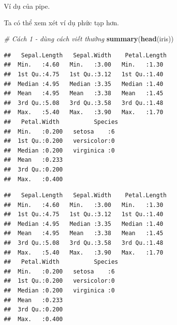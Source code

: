 \documentclass[]{krantz}
\makeatletter
\newenvironment{Shaded}{\begin{snugshade}}{\end{snugshade}}
\newcommand{\CommentTok}[1]{\textcolor[rgb]{0.37,0.37,0.37}{\textit{#1}}}
\newcommand{\KeywordTok}[1]{\textcolor[rgb]{0.27,0.27,0.27}{\textbf{#1}}}
\newcommand{\NormalTok}[1]{#1}
\newcommand{\OperatorTok}[1]{\textcolor[rgb]{0.43,0.43,0.43}{\textbf{#1}}}
\newcommand{\StringTok}[1]{\textcolor[rgb]{0.5,0.5,0.5}{#1}}
\newenvironment{kframe}{%
\medskip{}
\setlength{\fboxsep}{.8em}
 \def\at@end@of@kframe{}%
 \ifinner\ifhmode%
  \def\at@end@of@kframe{\end{minipage}}%
  \begin{minipage}{\columnwidth}%
 \fi\fi%
 \def\FrameCommand##1{\hskip\@totalleftmargin \hskip-\fboxsep
 \colorbox{shadecolor}{##1}\hskip-\fboxsep
     \hskip-\linewidth \hskip-\@totalleftmargin \hskip\columnwidth}%
 \MakeFramed {\advance\hsize-\width
   \@totalleftmargin\z@ \linewidth\hsize
   \@setminipage}}%
 {\par\unskip\endMakeFramed%
 \at@end@of@kframe}
\renewenvironment{Shaded}{\begin{kframe}}{\end{kframe}}
\renewenvironment{Shaded}{\begin{snugshade}}{\end{snugshade}}
\renewcommand{\CommentTok}[1]{\textcolor[rgb]{0.56,0.35,0.01}{\textit{#1}}}
\renewcommand{\KeywordTok}[1]{\textcolor[rgb]{0.13,0.29,0.53}{\textbf{#1}}}
\renewcommand{\NormalTok}[1]{#1}
\renewcommand{\OperatorTok}[1]{\textcolor[rgb]{0.81,0.36,0.00}{\textbf{#1}}}
\renewcommand{\StringTok}[1]{\textcolor[rgb]{0.31,0.60,0.02}{#1}}
\theoremstyle{definition}
\theoremstyle{definition}
\theoremstyle{definition}
\theoremstyle{remark}
\makeatother
\begin{document}
Ví dụ của pipe.

\begin{Shaded}
\end{Shaded}

Ta có thể xem xét ví dụ phức tạp hơn.

\begin{Shaded}
\begin{Highlighting}[]
\CommentTok{# Cách 1 - dùng cách viết thường}
\KeywordTok{summary}\NormalTok{(}\KeywordTok{head}\NormalTok{(iris))}
\end{Highlighting}
\end{Shaded}

\begin{verbatim}
##   Sepal.Length   Sepal.Width    Petal.Length 
##  Min.   :4.60   Min.   :3.00   Min.   :1.30  
##  1st Qu.:4.75   1st Qu.:3.12   1st Qu.:1.40  
##  Median :4.95   Median :3.35   Median :1.40  
##  Mean   :4.95   Mean   :3.38   Mean   :1.45  
##  3rd Qu.:5.08   3rd Qu.:3.58   3rd Qu.:1.48  
##  Max.   :5.40   Max.   :3.90   Max.   :1.70  
##   Petal.Width          Species 
##  Min.   :0.200   setosa    :6  
##  1st Qu.:0.200   versicolor:0  
##  Median :0.200   virginica :0  
##  Mean   :0.233                 
##  3rd Qu.:0.200                 
##  Max.   :0.400
\end{verbatim}

\begin{Shaded}
\end{Shaded}

\begin{verbatim}
##   Sepal.Length   Sepal.Width    Petal.Length 
##  Min.   :4.60   Min.   :3.00   Min.   :1.30  
##  1st Qu.:4.75   1st Qu.:3.12   1st Qu.:1.40  
##  Median :4.95   Median :3.35   Median :1.40  
##  Mean   :4.95   Mean   :3.38   Mean   :1.45  
##  3rd Qu.:5.08   3rd Qu.:3.58   3rd Qu.:1.48  
##  Max.   :5.40   Max.   :3.90   Max.   :1.70  
##   Petal.Width          Species 
##  Min.   :0.200   setosa    :6  
##  1st Qu.:0.200   versicolor:0  
##  Median :0.200   virginica :0  
##  Mean   :0.233                 
##  3rd Qu.:0.200                 
##  Max.   :0.400
\end{verbatim}
\end{document}
